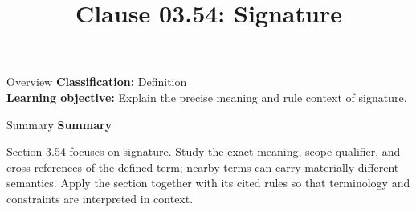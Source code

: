 \documentclass[10pt,letterpaper]{article}
\title{Clause 03.54: Signature}
\author{}
\date{}
\begin{document}
\maketitle
\begin{CornellOverviewBox}{Overview}
\textbf{Classification:} Definition\\[2pt]
\textbf{Learning objective:} Explain the precise meaning and rule context of signature.
\end{CornellOverviewBox}\begin{CornellSummaryBox}{Summary}
{\sffamily\bfseries\color{Accent} Summary}\par\vspace{3pt}Section 3.54 focuses on signature. Study the exact meaning, scope qualifier, and cross-references of the defined term; nearby terms can carry materially different semantics. Apply the section together with its cited rules so that terminology and constraints are interpreted in context.
\end{CornellSummaryBox}
\end{document}

